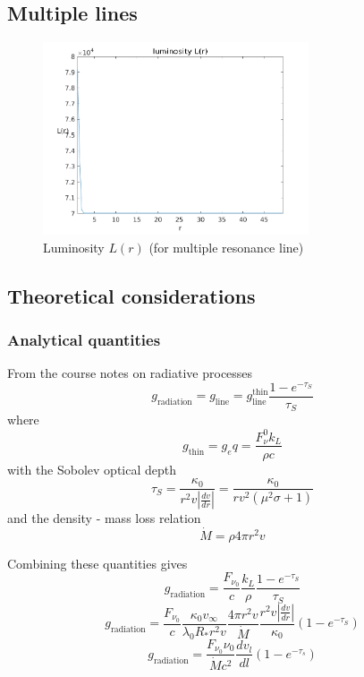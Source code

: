 \documentclass[../main/main.tex]{subfiles}
\begin{document}
\subsection{Multiple lines}
\begin{figure}[!htp]
\centering
\includegraphics[width=0.7\textwidth]{../../two_resonance_lines/figures/luminosity_multiple_resonance_line.png}
\caption{Luminosity $L(r)$ (for multiple resonance line)}
\label{luminosity_multiple_resonance_line}
\end{figure}

\subsection{Theoretical considerations}
\subsubsection{Analytical quantities}
From the course notes on radiative processes
\begin{equation}
g_{\text{radiation}} = g_{\text{line}} = g_{\text{line}}^{\text{thin}} \frac{1- e^{-\tau_S}}{\tau_S}
\end{equation}
where 
\begin{equation}
g_{\text{thin}} = g_e q = \frac{F_{\nu}^0 k_L}{\rho c}
\end{equation}
with the Sobolev optical depth
\begin{equation}
\tau_S = \frac{\kappa_0}{r^2 v \left| \frac{dv}{dr} \right| } = \frac{\kappa_0}{rv^2 (\mu^2 \sigma + 1)}
\end{equation}
and the density - mass loss relation
\begin{equation}
\dot{M} = \rho 4 \pi r^2 v
\end{equation}

Combining these quantities gives
\begin{equation}
g_{\text{radiation}} = \frac{F_{\nu_0}}{c}  \frac{k_L}{\rho }\frac{1- e^{-\tau_S}}{\tau_S}  
\end{equation}
\begin{equation}
g_{\text{radiation}} = \frac{F_{\nu_0}}{c} \frac{\kappa_0 v_{\infty}}{\lambda_0 R_* r^2 v} \frac{4 \pi r^2 v}{\dot{M}}  \frac{r^2 v \left | \frac{dv}{dr} \right| }{\kappa_0} \left( 1- e^{-\tau_S} \right)
\end{equation}
\begin{equation}
\boxed{g_{\text{radiation}} = \frac{F_{\nu_0} \nu_0 }{\dot{M} c^2} \frac{dv_l}{dl} \left(1-e^{- \tau_s} \right)}
\end{equation}
\end{document}
